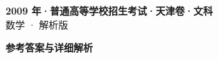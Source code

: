 \documentclass[zihao=-4, a4paper]{ctexart}
\begin{document}
\begin{center}
  {\Large\bfseries 2009 年·普通高等学校招生考试·天津卷·文科}\\[4pt]
  {\large 数学 · 解析版}
\end{center}
\medskip
{}

\clearpage
{}
\begin{center}{\Large\bfseries 参考答案与详细解析}\end{center}
\medskip

\end{document}
